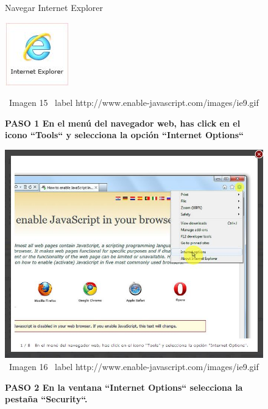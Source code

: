 \documentclass[11pt]{article} %
\begin{document}
\begin{figure}
\begin{center}
\begin{center}
Navegar Internet Explorer

\end{center}
\begin{center}
\includegraphics[height=3 cm, width=3 cm] {imagenes/explorer.jpg}
\end{center}

\ Imagen 15
\ label {http://www.enable-javascript.com/images/ie9.gif }
\newline

\begin{center}
\bf PASO 1
En el menú del navegador web, has click en el icono ``Tools`` y selecciona la opción ``Internet Options``
\end{center}
\includegraphics[height=8 cm, width=8 cm] {imagenes/explorer 01.jpg}
\newline
\newline
\ Imagen 16
\ label {http://www.enable-javascript.com/images/ie9.gif }

\begin{center}
\bf PASO 2
En la ventana ``Internet Options`` selecciona la pestaña ``Security``.
\end{center}


\end{center}
\end{figure}
\end{document}
